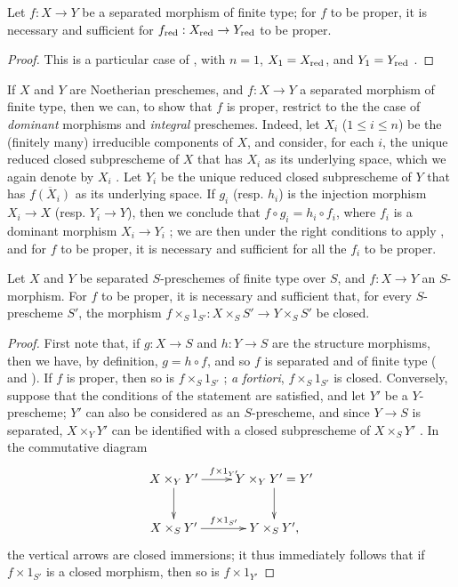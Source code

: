 \begin{corollary}[5.4.6]
\label{II.5.4.6}
Let $f:X\to Y$ be a separated morphism of finite type; for $f$ to be proper, it is necessary and sufficient for $f_\red:X_\red\to Y_\red$ to be proper.
\end{corollary}

\begin{proof}
\label{proof-II.5.4.6}
This is a particular case of , with $n=1$, $X_1=X_{\mathrm{red}}$, and $Y_1=Y_{\mathrm{red}}$ .
\end{proof}

\begin{env}[5.4.7]
\label{II.5.4.7}
If $X$ and $Y$ are Noetherian preschemes, and $f:X\to Y$ a separated morphism of finite type, then we can, to show that $f$ is proper, restrict to the the case of \emph{dominant} morphisms and \emph{integral} preschemes.
Indeed, let $X_i$ ($1\leq i\leq n$) be the (finitely many) irreducible components of $X$, and consider, for each $i$, the unique reduced closed subprescheme of $X$ that has $X_i$ as its underlying space, which we again denote by $X_i$ .
Let $Y_i$ be the unique reduced closed subprescheme of $Y$ that has $\overline{f(X_i)}$ as its underlying space.
If $g_i$ (resp. $h_i$) is the injection morphism $X_i\to X$ (resp. $Y_i\to Y$), then we conclude that $f\circ g_i=h_i\circ f_i$, where $f_i$ is a dominant morphism $X_i\to Y_i$ ;
we are then under the right conditions to apply , and for $f$ to be proper, it is necessary and sufficient for all the $f_i$ to be proper.
\end{env}

\begin{corollary}[5.4.8]
\label{II.5.4.8}
Let $X$ and $Y$ be separated $S$-preschemes of finite type over $S$, and $f:X\to Y$ an $S$-morphism.
For $f$ to be proper, it is necessary and sufficient that, for every $S$-prescheme $S'$, the morphism $f\times_S 1_{S'}:X\times_S S'\to Y\times_S S'$ be closed.
\end{corollary}

\begin{proof}
\label{proof-II.5.4.8}
First note that, if $g:X\to S$ and $h:Y\to S$ are the structure morphisms, then we have, by definition, $g=h\circ f$, and so $f$ is separated and of finite type ( and ).
If $f$ is proper, then so is $f\times_S 1_{S'}$ ; \emph{a fortiori}, $f\times_S 1_{S'}$ is closed.
Conversely, suppose that the conditions of the statement are satisfied, and let $Y'$ be a $Y$-prescheme;
$Y'$ can also be considered as an $S$-prescheme, and since $Y\to S$ is separated, $X\times_Y Y'$ can be identified with a closed subprescheme of $X\times_S Y'$ .
In the commutative diagram
\[
  \xymatrix{
    X\times_Y Y'\ar[r]^{f\times1_{Y'}}\ar[d] &
    Y\times_Y Y'=Y'\ar[d]\\
    X\times_S Y'\ar[r]^{f\times1_{S'}} &
    Y\times_S Y',
  }
\]
the vertical arrows are closed immersions; it thus immediately follows that if $f\times1_{S'}$ is a closed morphism, then so is $f\times1_{Y'}$
\end{proof}

